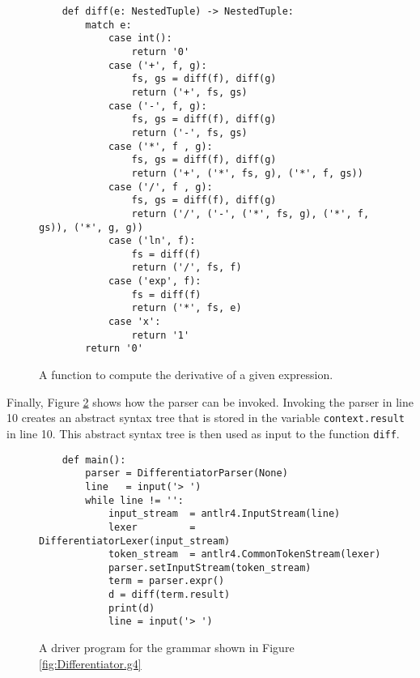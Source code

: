 \begin{figure}[!ht]
\centering
\begin{verbatim}
    def diff(e: NestedTuple) -> NestedTuple:
        match e:
            case int():
                return '0'
            case ('+', f, g):
                fs, gs = diff(f), diff(g)
                return ('+', fs, gs)
            case ('-', f, g):
                fs, gs = diff(f), diff(g)
                return ('-', fs, gs)
            case ('*', f , g):
                fs, gs = diff(f), diff(g)
                return ('+', ('*', fs, g), ('*', f, gs))
            case ('/', f , g):
                fs, gs = diff(f), diff(g)
                return ('/', ('-', ('*', fs, g), ('*', f, gs)), ('*', g, g))
            case ('ln', f):
                fs = diff(f) 
                return ('/', fs, f)
            case ('exp', f):
                fs = diff(f) 
                return ('*', fs, e)
            case 'x':
                return '1'
        return '0'
\end{verbatim}
\vspace*{-0.3cm}
\caption{A function to compute the derivative of a given expression.}
\label{fig:Differentiator.ipynb:diff}
\end{figure}


Finally, Figure \ref{fig:Differentiator.ipynb:main} shows how the parser can be invoked.
Invoking the parser in line 10 creates an abstract syntax tree that is stored in the variable
\texttt{context.result} in line 10.  This abstract syntax tree is then used as input to the function
\texttt{diff}. 

\begin{figure}[!ht]
\centering
\begin{verbatim}
    def main():
        parser = DifferentiatorParser(None)
        line   = input('> ')
        while line != '':
            input_stream  = antlr4.InputStream(line)
            lexer         = DifferentiatorLexer(input_stream)
            token_stream  = antlr4.CommonTokenStream(lexer)
            parser.setInputStream(token_stream)
            term = parser.expr()
            d = diff(term.result)
            print(d)
            line = input('> ')
\end{verbatim}
\vspace*{-0.3cm}
\caption{A driver program for the grammar shown in Figure \ref{fig:Differentiator.g4}}
\label{fig:Differentiator.ipynb:main}
\end{figure}
\pagebreak

